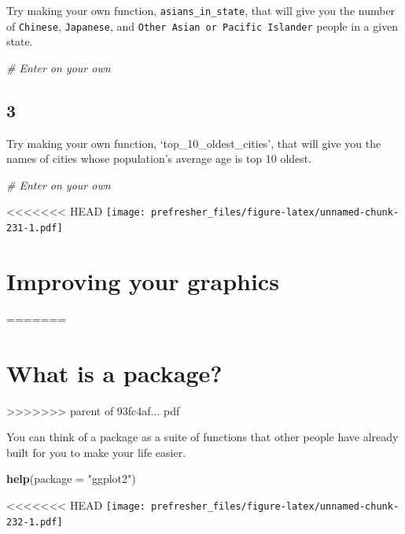 \documentclass[]{book}
\newenvironment{Shaded}{\begin{snugshade}}{\end{snugshade}}
\newcommand{\CommentTok}[1]{\textcolor[rgb]{0.56,0.35,0.01}{\textit{#1}}}
\newcommand{\DataTypeTok}[1]{\textcolor[rgb]{0.13,0.29,0.53}{#1}}
\newcommand{\KeywordTok}[1]{\textcolor[rgb]{0.13,0.29,0.53}{\textbf{#1}}}
\newcommand{\NormalTok}[1]{#1}
\newcommand{\StringTok}[1]{\textcolor[rgb]{0.31,0.60,0.02}{#1}}
\theoremstyle{definition}
\theoremstyle{definition}
\theoremstyle{definition}
\theoremstyle{remark}
\begin{document}
\begin{Shaded}
\begin{Highlighting}[]
\begin{Shaded}
\begin{Highlighting}[]
\begin{Shaded}
\begin{Highlighting}[]
Try making your own function, \texttt{asians\_in\_state}, that will give you the number of \texttt{Chinese}, \texttt{Japanese}, and \texttt{Other\ Asian\ or\ Pacific\ Islander} people in a given state.

\begin{Shaded}
\begin{Highlighting}[]
\CommentTok{# Enter on your own}
\end{Highlighting}
\end{Shaded}

\hypertarget{section-16}{%
\subsection*{3}\label{section-16}}

Try making your own function, `top\_10\_oldest\_cities', that will give you the names of cities whose population's average age is top 10 oldest.

\begin{Shaded}
\begin{Highlighting}[]
\CommentTok{# Enter on your own}
\end{Highlighting}
\end{Shaded}

<<<<<<< HEAD
\texttt{[image: prefresher\_files/figure-latex/unnamed-chunk-231-1.pdf]}

\hypertarget{improving-your-graphics}{%
\section{Improving your graphics}\label{improving-your-graphics}}
=======
\hypertarget{what-is-a-package}{%
\section{What is a package?}\label{what-is-a-package}}
>>>>>>> parent of 93fc4af... pdf

You can think of a package as a suite of functions that other people have already built for you to make your life easier.

\begin{Shaded}
\begin{Highlighting}[]
\KeywordTok{help}\NormalTok{(}\DataTypeTok{package =} \StringTok{"ggplot2"}\NormalTok{)}
\end{Highlighting}
\end{Shaded}

<<<<<<< HEAD
\texttt{[image: prefresher\_files/figure-latex/unnamed-chunk-232-1.pdf]}


\end{Highlighting}
\end{Shaded}
\end{Highlighting}
\end{Shaded}
\end{Highlighting}
\end{Shaded}
\end{document}
